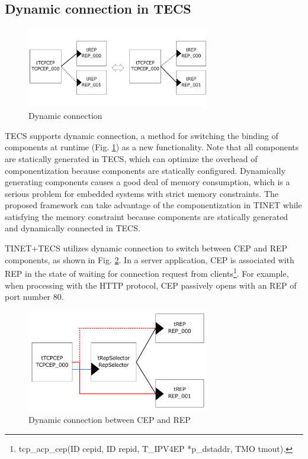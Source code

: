 \documentclass[conference]{IEEEtran/IEEEtran}
\begin{document}


\subsection{Dynamic connection in TECS}
\label{sec:DynamicConnection}

\begin{figure}[t]
    \centering
    \includegraphics[width=8.0cm,clip]{figure/DynamicConnection.pdf}
    \vspace{-1mm} \caption{Dynamic connection}
    \vspace{-1mm} \label{fig:DynamicConnection}
\end{figure}

TECS supports dynamic connection, a method for switching the binding of components at runtime (Fig. \ref{fig:DynamicConnection}) as a new functionality.
Note that all components are statically generated in TECS, which can optimize the overhead of componentization because components are statically configured.
Dynamically generating components causes a good deal of memory consumption, which is a serious problem for embedded systems with strict memory constraints.
The proposed framework can take advantage of the componentization in TINET while satisfying the memory constraint because components are statically generated and dynamically connected in TECS.

TINET+TECS utilizes dynamic connection to switch between CEP and REP components, as shown in Fig. \ref{fig:DynamicConnectionUseCase}.
In a server application, CEP is associated with REP in the state of waiting for connection request from clients\footnote{tcp\_acp\_cep(ID cepid, ID repid, T\_IPV4EP *p\_dstaddr, TMO tmout).}.
For example, when processing with the HTTP protocol, CEP passively opens with an REP of port number 80.

\begin{figure}[t]
    \centering
    \includegraphics[width=8.0cm,clip]{figure/DynamicConnectionUseCase.pdf}
    \vspace{-1mm} \caption{Dynamic connection between CEP and REP}
    \vspace{-1mm} \label{fig:DynamicConnectionUseCase}
\end{figure}
\end{document}
